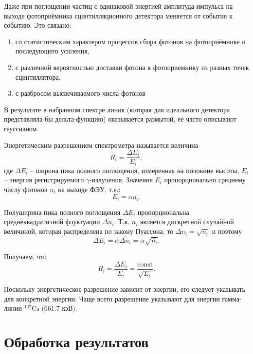 \documentclass[a4paper, 12pt]{article}
\begin{document}
Даже при поглощении частиц с одинаковой энергией амплитуда импульса на выходе фотоприёмника сцинтилляционного детектора меняется от события к событию. Это связано:
\begin{enumerate}
\item со статистическим характером процессов сбора фотонов на фотоприёмнике и последующего усиления,
\item с различной вероятностью доставки фотона к фотоприемнику из разных точек сцинтиллятора,
\item с разбросом высвечиваемого числа фотонов
\end{enumerate}
\par
В результате в набранном спектре линия (которая для идеального детектора представляла бы дельта-функцию) оказывается размытой, её часто описывают гауссианом.\par
Энергетическим разрешением спектрометра называется величина
\begin{equation}
R_i=\frac{\Delta E_i}{E_i},
\end{equation}
где $\Delta E_i$ -- ширина пика полного поглощения, измеренная на половине высоты, $E_i$ -- энергия регистрируемого $\gamma$-излучения. Значение $E_i$ пропорционально среднему числу фотонов $\overline{n_i}$ на выходе ФЭУ, т.е.:
\begin{equation}
E_i=\alpha\overline{n_i}.
\label{eq:4}
\end{equation}
\par
Полуширина пика полного поглощения $\Delta E_i$ пропорциональна среднеквадратичной флуктуации $\overline{\Delta n_i}$. Т.к. $n_i$ является дискретной случайной величиной, которая распределена по закону Пуассона, то $\overline{\Delta n_i}=\sqrt{\overline{n_i}}$ и поэтому
\begin{equation}
\Delta E_i=\alpha\overline{\Delta n_i}=\alpha\sqrt{\overline{n_i}}.
\label{eq:5}
\end{equation}
\par
Получаем, что
\begin{equation}
R_i=\frac{\Delta E_i}{E_i}=\frac{\text{const}}{\sqrt{E_i}}.
\label{eq:6}
\end{equation}
\par
Поскольку энергетическое разрешение зависит от энергии, его следует указывать для конкретной энергии. Чаще всего разрешение указывают для энергии гамма-линии $^{137}\text{Cs}$ (661.7 кэВ).
\section{Обработка результатов}
\end{document}
